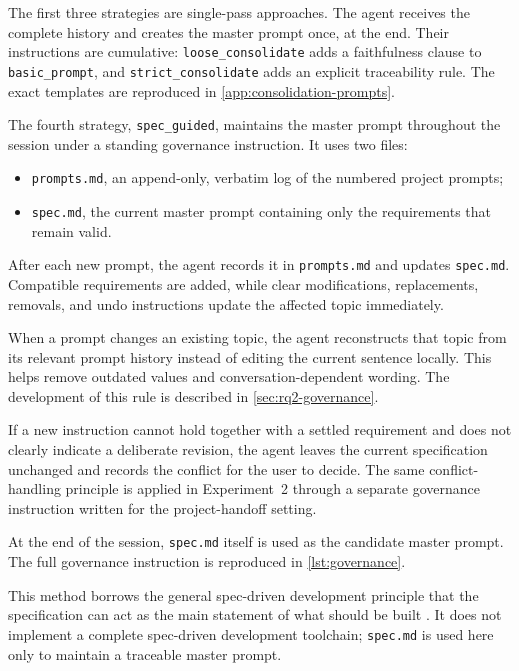 The first three strategies are single-pass approaches. The agent receives the
complete history and creates the master prompt once, at the end. Their
instructions are cumulative: \texttt{loose\_consolidate} adds a faithfulness
clause to \texttt{basic\_prompt}, and \texttt{strict\_consolidate} adds an
explicit traceability rule. The exact templates are reproduced in
\cref{app:consolidation-prompts}.

The fourth strategy, \texttt{spec\_guided}, maintains the master prompt
throughout the session under a standing governance instruction. It uses two
files:

\begin{itemize}[leftmargin=*]
  \item \texttt{prompts.md}, an append-only, verbatim log of the numbered
  project prompts;
  \item \texttt{spec.md}, the current master prompt containing only the
  requirements that remain valid.
\end{itemize}

After each new prompt, the agent records it in \texttt{prompts.md} and updates
\texttt{spec.md}. Compatible requirements are added, while clear
modifications, replacements, removals, and undo instructions update the
affected topic immediately.

When a prompt changes an existing topic, the agent reconstructs that topic
from its relevant prompt history instead of editing the current sentence
locally. This helps remove outdated values and conversation-dependent wording.
The development of this rule is described in
\cref{sec:rq2-governance}.

If a new instruction cannot hold together with a settled requirement and does
not clearly indicate a deliberate revision, the agent leaves the current
specification unchanged and records the conflict for the user to decide. The
same conflict-handling principle is applied in Experiment~2 through a
separate governance instruction written for the project-handoff setting.

At the end of the session, \texttt{spec.md} itself is used as the candidate
master prompt. The full governance instruction is reproduced in
\cref{lst:governance}.

This method borrows the general spec-driven development principle that the
specification can act as the main statement of what should be built
\citep{piskala2026specdriven}. It does not implement a complete spec-driven
development toolchain; \texttt{spec.md} is used here only to maintain a
traceable master prompt.

